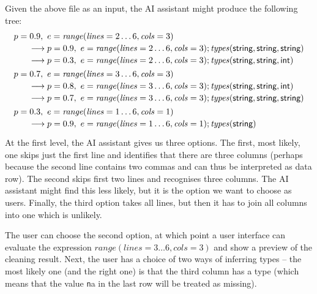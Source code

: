 \documentclass{article}
\begin{document}
Given the above file as an input, the AI assistant might produce the following tree:
%
\begin{equation*}
\begin{array}{l}
p=0.9,~ e=\mathit{range}(\mathit{lines}=2\ldots 6, \mathit{cols}=3)\\[0.2em]
\qquad\longrightarrow p=0.9,~ e=\mathit{range}(\mathit{lines}=2\ldots 6, \mathit{cols}=3); \mathit{types}(\textnormal{\sffamily string},\textnormal{\sffamily string},\textnormal{\sffamily string})\\[0.2em]
\qquad\longrightarrow p=0.3,~ e=\mathit{range}(\mathit{lines}=2\ldots 6, \mathit{cols}=3); \mathit{types}(\textnormal{\sffamily string},\textnormal{\sffamily string},\textnormal{\sffamily int})\\[0.4em]
p=0.7,~ e=\mathit{range}(\mathit{lines}=3\ldots 6, \mathit{cols}=3)\\[0.2em]
\qquad\longrightarrow p=0.8,~ e=\mathit{range}(\mathit{lines}=3\ldots 6, \mathit{cols}=3); \mathit{types}(\textnormal{\sffamily string},\textnormal{\sffamily string},\textnormal{\sffamily int})\\[0.2em]
\qquad\longrightarrow p=0.7,~ e=\mathit{range}(\mathit{lines}=3\ldots 6, \mathit{cols}=3); \mathit{types}(\textnormal{\sffamily string},\textnormal{\sffamily string},\textnormal{\sffamily string})\\[0.4em]
p=0.3,~ e=\mathit{range}(\mathit{lines}=1\ldots 6, \mathit{cols}=1)\\[0.2em]
\qquad\longrightarrow p=0.9,~ e=\mathit{range}(\mathit{lines}=1\ldots 6, \mathit{cols}=1); \mathit{types}(\textnormal{\sffamily string})\\[0.2em]
\end{array}
\end{equation*}
%
At the first level, the AI assistant gives us three options. The first, most likely, one skips just 
the first line and identifies that there are three columns (perhaps because the second line contains 
two commas and can thus be interpreted as data row). The second skips first two lines and recognises
three columns. The AI assistant might find this less likely, but it is the option we want to choose
as users. Finally, the third option takes all lines, but then it has to join all columns into one
which is unlikely.

The user can choose the second option, at which point a user interface can evaluate the 
expression $\mathit{range}(\mathit{lines}=3\ldots 6, \mathit{cols}=3)$ and show a preview of 
the cleaning result. Next, the user has a choice of two ways of inferring types -- the most 
likely one (and the right one) is that the third column has a type  (which means that
the value {\texttt na} in the last row will be treated as missing).
\end{document}
